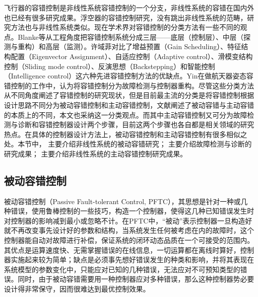 飞行器的容错控制是非线性系统容错控制的一个分支，非线性系统的容错在国内外也已经有很多研究成果。浮空器的容错控制研究，没有跳出非线性系统的范畴，研究方法也与非线性系统类似。现在学术界对容错控制的分类方法有一些不同的观点。Blanke等\cite{BLANKE1997693}从工程角度把容错控制系统分成三层——底层（控制层）、中层（探测与重构）和高层（监测）。许域菲\cite{xuyufei2011}对比了增益预置（Gain Scheduling）、特征结构配置（Eigenvector Assignment）、自适应控制（Adaptive control）、滑模变结构控制（Sliding mode control）、反演思想（Backstepping）和智能控制（Intelligence control）这六种先进容错控制方法的优缺点。Yin在做航天器姿态容错控制的工作中，认为将容错控制分为故障检测与控制器重构\cite{7407616}。尽管这些分类方法从不同角度阐述了容错控制的研究现状，但是目前最主流的分类是将容错控制根据设计思路不同分为被动容错控制和主动容错控制\cite{Zhang2008229,5160615,jiang2005fault,gaozhifeng2011,xuyufei2011,wangdejun2014}，文献阐述了被动容错与主动容错的本质上的不同，本文也采纳这一分类观点。而其中主动容错控制又可分为故障检测与诊断和容错控制器设计两个步骤，目前这两个步骤也各自都是相关领域的研究热点。在具体的控制器设计方法上，被动容错控制和主动容错控制有很多相似之处。本节中， 主要介绍非线性系统的被动容错研究； 主要介绍故障检测与诊断的研究成果； 主要介绍非线性系统的主动容错控制研究成果。

\subsection{被动容错控制}\label{subsec:passive}
被动容错控制（Passive Fault-tolerant Control, PFTC），其思想是针对一种或几种错误，使用鲁棒控制的一些技巧，构造一个控制器，使得这几种已知错误发生时对控制器的影响减到最小或忽略不计\cite{jiang2005fault,6859271}。在PFTC中，“被动”表示控制器一旦构造好就不再改变事先设计好的参数和结构，当系统发生任何被考虑在内的故障时，这个控制器能自动对故障进行补偿，保证系统的闭环动态品质在一个可接受的范围内。其优点是运算速度快、无需掌握错误的在线信息，一切运算都在离线时算好，控制器实施起来较为简单；缺点是必须事先想好错误发生的种类和影响，并将其表现在系统模型的参数变化中，只能应对已知的几种错误，无法应对不可预知类型的错误。同时，由于被动容错需要用一种控制器应对多种错误，那么这种控制器势必要设计得非常保守，因而很难达到最优控制效果\cite{jiang2005fault}。


